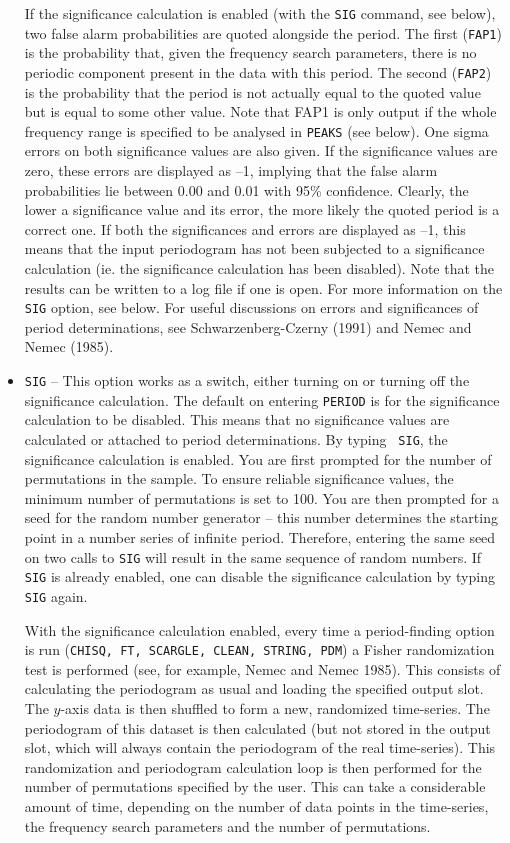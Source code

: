 \begin{itemize}
If the significance calculation is enabled (with the {\tt SIG} command, see
below), two false alarm probabilities are quoted alongside the period. The
first ({\tt FAP1}) is the probability that, given the frequency search
parameters, there is no periodic component present in the data with this
period. The second ({\tt FAP2}) is the probability that the period is not
actually equal to the quoted value but is equal to some other value. Note that
FAP1 is only output if the whole frequency range is specified to be analysed in
{\tt PEAKS} (see below). One sigma errors on both significance values are also
given. If the significance values are zero, these errors are displayed as --1,
implying that the false alarm probabilities lie between 0.00 and 0.01 with 95\%
confidence. Clearly, the lower a significance value and its error, the more
likely the quoted period is a correct one. If both the significances and errors
are displayed as --1, this means that the input periodogram has not been
subjected to a significance calculation (ie. the significance calculation has
been disabled). Note that the results can be written to a log file if one is
open. For more information on the {\tt SIG} option, see below. For useful
discussions on errors and significances of period determinations, see
Schwarzenberg-Czerny (1991) and Nemec and Nemec (1985). 

\item {\tt SIG} -- This option works as a switch, either turning on or turning
off the significance calculation. The default on entering {\tt PERIOD} is for
the significance calculation to be disabled. This means that no significance
values are calculated or attached to period determinations. By typing {\tt
SIG}, the significance calculation is enabled. You are first prompted for the
number of permutations in the sample. To ensure reliable significance values,
the minimum number of permutations is set to 100. You are then prompted for a
seed for the random number generator -- this number determines the starting
point in a number series of infinite period. Therefore, entering the same seed
on two calls to {\tt SIG} will result in the same sequence of random numbers.
If {\tt SIG} is already enabled, one can disable the significance calculation
by typing {\tt SIG} again. 

With the significance calculation enabled, every time a period-finding option
is run ({\tt CHISQ, FT, SCARGLE, CLEAN, STRING, PDM}) a Fisher randomization
test is performed (see, for example, Nemec and Nemec 1985). This consists of
calculating the periodogram as usual and loading the specified output slot. The
$y$-axis data is then shuffled to form a new, randomized time-series. The
periodogram of this dataset is then calculated (but not stored in the output
slot, which will always contain the periodogram of the real time-series). This
randomization and periodogram calculation loop is then performed for the number
of permutations specified by the user. This can take a considerable amount of
time, depending on the number of data points in the time-series, the frequency
search parameters and the number of permutations. 


\end{itemize}
